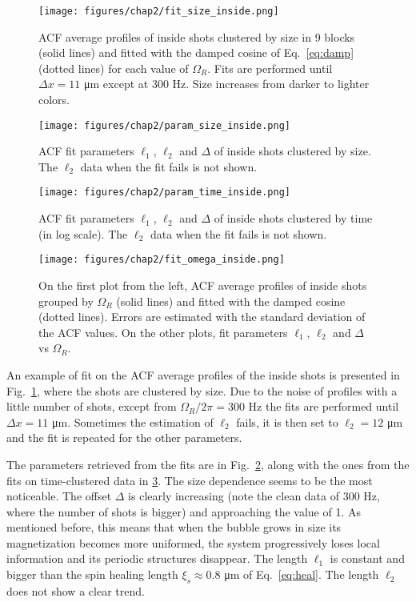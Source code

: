 \begin{figure}[ht!]
    \centering
    \texttt{[image: figures/chap2/fit\_size\_inside.png]}
    \caption{ACF average profiles of inside shots clustered by size in 9 blocks (solid lines) and fitted with the damped cosine of Eq.\ \eqref{eq:damp} (dotted lines) for each value of $\Omega_R$. Fits are performed until $\Delta x = 11$ \unit{\micro\meter} except at 300 Hz. Size increases from darker to lighter colors.}
    \label{fig:fit_size_inside}
\end{figure}
\begin{figure}[ht!]
    \centering
    \texttt{[image: figures/chap2/param\_size\_inside.png]}
    \caption{ACF fit parameters $\ell_1$, $\ell_2$ and $\Delta$ of inside shots clustered by size. The $\ell_2$ data when the fit fails is not shown.}
    \label{fig:param_size_inside}
\end{figure}
\begin{figure}[ht!]
    \centering
    \texttt{[image: figures/chap2/param\_time\_inside.png]}
    \caption{ACF fit parameters $\ell_1$, $\ell_2$ and $\Delta$ of inside shots clustered by time (in log scale). The $\ell_2$ data when the fit fails is not shown.}
    \label{fig:param_time_inside}
\end{figure}
\begin{figure}[ht!]
    \centering
    \texttt{[image: figures/chap2/fit\_omega\_inside.png]}
    \caption{On the first plot from the left, ACF average profiles of inside shots grouped by $\Omega_R$ (solid lines) and fitted with the damped cosine (dotted lines). Errors are estimated with the standard deviation of the ACF values. On the other plots, fit parameters $\ell_1$, $\ell_2$ and $\Delta$ vs $\Omega_R$.}
    \label{fig:fit_omega_inside}
\end{figure}
An example of fit on the ACF average profiles of the inside shots is presented in Fig.\ \ref{fig:fit_size_inside}, where the shots are clustered by size. Due to the noise of profiles with a little number of shots, except from $\Omega_R/2\pi = 300$ \unit{\hertz} the fits are performed until $\Delta x = 11$ \unit{\micro\meter}. Sometimes the estimation of $\ell_2$ fails, it is then set to $\ell_2 = 12$ \unit{\micro\meter} and the fit is repeated for the other parameters.

The parameters retrieved from the fits are in Fig.\ \ref{fig:param_size_inside}, along with the ones from the fits on time-clustered data in \ref{fig:param_time_inside}. 
The size dependence seems to be the most noticeable. The offset $\Delta$ is clearly increasing (note the clean data of 300 Hz, where the number of shots is bigger) and approaching the value of 1. As mentioned before, this means that when the bubble grows in size its magnetization becomes more uniformed, the system progressively loses local information and its periodic structures disappear.
The length $\ell_1$ is constant and bigger than the spin healing length $\xi_s \approx 0.8$ \unit{\micro\meter} of Eq.\ \eqref{eq:heal}. 
The length $\ell_2$ does not show a clear trend.

